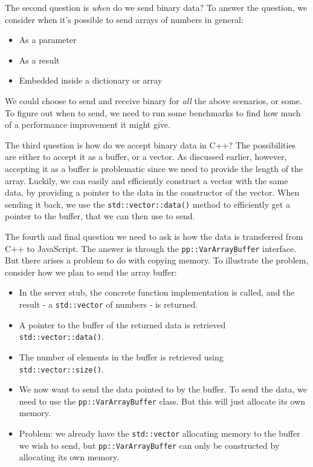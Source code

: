 The second question is \emph{when} do we send binary data? To answer the question, we consider when it's possible to send arrays of numbers in general:

\begin{itemize}
	\item As a parameter
	\item As a result
	\item Embedded inside a dictionary or array
\end{itemize}

We could choose to send and receive binary for \emph{all} the above scenarios, or some. To figure out when to send, we need to run some benchmarks to find how much of a performance improvement it might give.

The third question is how do we accept binary data in C++? The possibilities are either to accept it as a buffer, or a vector. As discussed earlier, however, accepting it as a buffer is problematic since we need to provide the length of the array. Luckily, we can easily and efficiently construct a vector with the same data, by providing a pointer to the data in the constructor of the vector. When sending it back, we use the \lstinline{std::vector::data()} method to efficiently get a pointer to the buffer, that we can then use to send.

The fourth and final question we need to ask is how the data is transferred from C++ to JavaScript. The answer is through the \lstinline{pp::VarArrayBuffer} interface. But there arises a problem to do with copying memory. To illustrate the problem, consider how we plan to send the array buffer:

\begin{itemize}
	\item In the server stub, the concrete function implementation is called, and the result - a \lstinline{std::vector} of numbers - is returned.
	\item A pointer to the buffer of the returned data is retrieved \lstinline{std::vector::data()}.
	\item The number of elements in the buffer is retrieved using \lstinline{std::vector::size()}.
	\item We now want to send the data pointed to by the buffer. To send the data, we need to use the \lstinline{pp::VarArrayBuffer} class. But this will just allocate its own memory.
	\item Problem: we already have the \lstinline{std::vector} allocating memory to the buffer we wish to send, but \lstinline{pp::VarArrayBuffer} can only be constructed by allocating its own memory.
\end{itemize}

